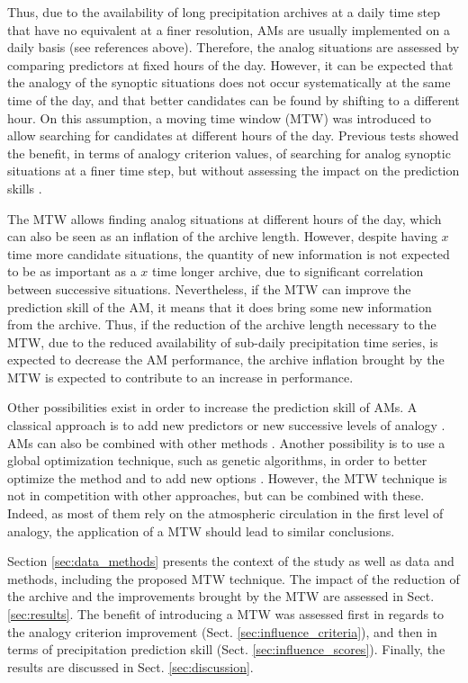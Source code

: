 \documentclass[hess, manuscript]{copernicus}
\begin{document}
Thus, due to the availability of long precipitation archives at a daily time step that have no equivalent at a finer resolution, AMs are usually implemented on a daily basis (see references above). Therefore, the analog situations are assessed by comparing predictors at fixed hours of the day. However, it can be expected that the analogy of the synoptic situations does not occur systematically at the same time of the day, and that better candidates can be found by shifting to a different hour. On this assumption, a moving time window (MTW) was introduced to allow searching for candidates at different hours of the day. Previous tests showed the benefit, in terms of analogy criterion values, of searching for analog synoptic situations at a finer time step, but without assessing the impact on the prediction skills \citep{Finet2008}.

The MTW allows finding analog situations at different hours of the day, which can also be seen as an inflation of the archive length. However, despite having $x$ time more candidate situations, the quantity of new information is not expected to be as important as a $x$ time longer archive, due to significant correlation between successive situations. Nevertheless, if the MTW can improve the prediction skill of the AM, it means that it does bring some new information from the archive. Thus, if the reduction of the archive length necessary to the MTW, due to the reduced availability of sub-daily precipitation time series, is expected to decrease the AM performance, the archive inflation brought by the MTW is expected to contribute to an increase in performance.

Other possibilities exist in order to increase the prediction skill of AMs. A classical approach is to add new predictors or new successive levels of analogy \citep[see e.g.][]{Horton2012a, BenDaoud2016, Caillouet2016}. AMs can also be combined with other methods \citep[see e.g.][]{Chardon2014}. Another possibility is to use a global optimization technique, such as genetic algorithms, in order to better optimize the method and to add new options \citep{Horton2016}. However, the MTW technique is not in competition with other approaches, but can be combined with these. Indeed, as most of them rely on the atmospheric circulation in the first level of analogy, the application of a MTW should lead to similar conclusions.

Section \ref{sec:data_methods} presents the context of the study as well as data and methods, including the proposed MTW technique. The impact of the reduction of the archive and the improvements brought by the MTW are assessed in Sect. \ref{sec:results}. The benefit of introducing a MTW was assessed first in regards to the analogy criterion improvement (Sect. \ref{sec:influence_criteria}), and then in terms of precipitation prediction skill (Sect. \ref{sec:influence_scores}). Finally, the results are discussed in Sect. \ref{sec:discussion}.
\end{document}
